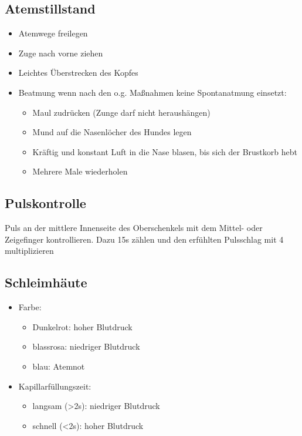    \subsection{Atemstillstand}
        \begin{itemize}
            \item Atemwege freilegen
            \item Zuge nach vorne ziehen
            \item Leichtes Überstrecken des Kopfes
            \item Beatmung wenn nach den o.g. Maßnahmen keine Spontanatmung einsetzt:
            \begin{itemize}
                \item Maul zudrücken (Zunge darf nicht heraushängen)
                \item Mund auf die Nasenlöcher des Hundes legen
                \item Kräftig und konstant Luft in die Nase blasen, bis sich der Brustkorb hebt
                \item Mehrere Male wiederholen
            \end{itemize}
        \end{itemize}

    \subsection{Pulskontrolle}
        Puls an der mittlere Innenseite des Oberschenkels mit dem Mittel- oder Zeigefinger kontrollieren. Dazu 15s zählen und den erfühlten Pulsschlag mit 4 multiplizieren

    \subsection{Schleimhäute}
        \begin{itemize}
            \item Farbe:
            \begin{itemize}
                \item Dunkelrot: hoher Blutdruck
                \item blassrosa: niedriger Blutdruck
                \item blau: Atemnot
            \end{itemize}
            \item Kapillarfüllungszeit:
            \begin{itemize}
                \item langsam (>2s): niedriger Blutdruck
                \item schnell (<2s): hoher Blutdruck
            \end{itemize}
        \end{itemize}

